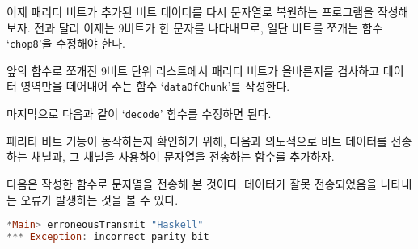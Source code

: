 이제 패리티 비트가 추가된 비트 데이터를 다시 문자열로 복원하는 프로그램을
작성해 보자. 전과 달리 이제는 9비트가 한 문자를 나타내므로, 일단 비트를 쪼개는
함수 `\texttt{chop8}'을 수정해야 한다.

앞의 함수로 쪼개진 9비트 단위 리스트에서 패리티 비트가 올바른지를 검사하고
데이터 영역만을 떼어내어 주는 함수 `\texttt{dataOfChunk}'를 작성한다.

마지막으로 다음과 같이 `\texttt{decode}' 함수를 수정하면 된다.


패리티 비트 기능이 동작하는지 확인하기 위해, 다음과 의도적으로 비트 데이터를
전송하는 채널과, 그 채널을 사용하여 문자열을 전송하는 함수를 추가하자.

다음은 작성한 함수로 문자열을 전송해 본 것이다. 데이터가 잘못 전송되었음을
나타내는 오류가 발생하는 것을 볼 수 있다.
\begin{lstlisting}[language=Haskell]
*Main> erroneousTransmit "Haskell"
*** Exception: incorrect parity bit
\end{lstlisting}



